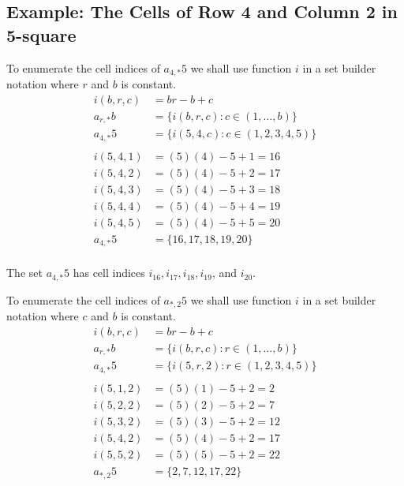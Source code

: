 \documentclass[letterpaper, twoside,12pt]{article}
\begin{document}
    \subsection{Example: The Cells of Row 4 and Column 2 in 5-square}
    To enumerate the cell indices of $a_{4,*}5$ we shall use function $i$ in a set builder notation where $r$ and $b$ is constant.
    \begin{equation*}
        \begin{split}
            i(b,r,c) &= br - b + c \\
            a_{r,*}b &= \{ i(b,r,c) : c \in (1, \dots, b) \} \\
            a_{4,*}5 &= \{ i(5,4,c) : c \in (1,2,3,4,5) \} \\
            \\
            i(5,4,1) &= (5)(4) - 5 + 1 = 16 \\
            i(5,4,2) &= (5)(4) - 5 + 2 = 17 \\
            i(5,4,3) &= (5)(4) - 5 + 3 = 18 \\
            i(5,4,4) &= (5)(4) - 5 + 4 = 19 \\
            i(5,4,5) &= (5)(4) - 5 + 5 = 20 \\
            a_{4,*}5 &= \{16, 17, 18, 19, 20 \} \\
        \end{split}
    \end{equation*}

    The set $a_{4,*}5$ has cell indices $i_{16}, i_{17}, i_{18}, i_{19}$, and $i_{20}$.

    To enumerate the cell indices of $a_{*,2}5$ we shall use function $i$ in a set builder notation where $c$ and $b$ is constant.
    \begin{equation*}
        \begin{split}
            i(b,r,c) &= br - b + c \\
            a_{r,*}b &= \{ i(b,r,c) : r \in (1, \dots, b) \} \\
            a_{4,*}5 &= \{ i(5,r,2) : r \in (1,2,3,4,5) \} \\
            \\
            i(5,1,2) &= (5)(1) - 5 + 2 = 2 \\
            i(5,2,2) &= (5)(2) - 5 + 2 = 7 \\
            i(5,3,2) &= (5)(3) - 5 + 2 = 12 \\
            i(5,4,2) &= (5)(4) - 5 + 2 = 17 \\
            i(5,5,2) &= (5)(5) - 5 + 2 = 22 \\
            a_{*,2}5 &= \{2, 7, 12, 17, 22 \} \\
        \end{split}
    \end{equation*}
\end{document}
